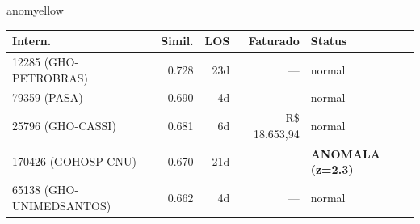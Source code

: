\documentclass[a4paper,10pt]{article}
\begin{document}
\begin{anomalycard}[Internacao 132070 | GHO-PETROBRAS | MODERADO (z=2.19)]{anomyellow}
\begin{tabular}{l r r r l}\toprule\textbf{Intern.} & \textbf{Simil.} & \textbf{LOS} & \textbf{Faturado} & \textbf{Status} \\\midrule
12285 (GHO-PETROBRAS) & 0.728 & 23d & --- & \textcolor{jcubeblue}{normal} \\
79359 (PASA) & 0.690 & 4d & --- & \textcolor{jcubeblue}{normal} \\
25796 (GHO-CASSI) & 0.681 & 6d & R\$ 18.653,94 & \textcolor{jcubeblue}{normal} \\
170426 (GOHOSP-CNU) & 0.670 & 21d & --- & \textcolor{anomred}{\textbf{ANOMALA (z=2.3)}} \\
65138 (GHO-UNIMEDSANTOS) & 0.662 & 4d & --- & \textcolor{jcubeblue}{normal} \\
\bottomrule\end{tabular}


\end{anomalycard}

\newpage
\end{document}
